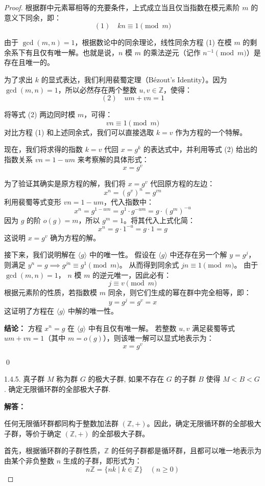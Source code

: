 \documentclass[]{article}
\begin{document}
\begin{proof}
根据群中元素幂相等的充要条件，上式成立当且仅当指数在模元素阶 $m$ 的意义下同余，即：
\[ (1) \quad kn \equiv 1 \pmod m \]

由于 $\gcd(m, n) = 1$，根据数论中的同余理论，线性同余方程 (1) 在模 $m$ 的剩余系下有且仅有唯一解。也就是说，$n$ 模 $m$ 的乘法逆元（记作 $n^{-1} \pmod m$）是存在且唯一的。

为了求出 $k$ 的显式表达，我们利用裴蜀定理（Bézout's Identity）。因为 $\gcd(m, n) = 1$，所以必然存在两个整数 $u, v \in \mathbb{Z}$，使得：
\[ (2) \quad um + vn = 1 \]

将等式 (2) 两边同时模 $m$，可得：
\[ vn \equiv 1 \pmod m \]
对比方程 (1) 和上述同余式，我们可以直接选取 $k = v$ 作为方程的一个特解。

现在，我们将求得的指数 $k = v$ 代回 $x = g^k$ 的表达式中，并利用等式 (2) 给出的指数关系 $vn = 1 - um$ 来考察解的具体形式：
\[ x = g^v \]

为了验证其确实是原方程的解，我们将 $x = g^v$ 代回原方程的左边：
\[ x^n = (g^v)^n = g^{vn} \]
利用裴蜀等式变形 $vn = 1 - um$，代入指数中：
\[ x^n = g^{1 - um} = g^1 \cdot g^{-um} = g \cdot (g^m)^{-u} \]
因为 $g$ 的阶 $o(g) = m$，所以 $g^m = 1$。将其代入上式化简：
\[ x^n = g \cdot 1^{-u} = g \cdot 1 = g \]
这说明 $x = g^v$ 确为方程的解。

接下来，我们说明解在 $\langle g\rangle$ 中的唯一性。
假设在 $\langle g\rangle$ 中还存在另一个解 $y = g^j$，则满足 $y^n = g \implies g^{jn} \equiv g^1 \pmod m$。
从而得到同余式 $jn \equiv 1 \pmod m$。
由于 $\gcd(m, n) = 1$， $n$ 模 $m$ 的逆元唯一，因此必有：
\[ j \equiv v \pmod m \]
根据元素阶的性质，若指数模 $m$ 同余，则它们生成的幂在群中完全相等，即：
\[ y = g^j = g^v = x \]
这证明了方程在 $\langle g\rangle$ 中解的唯一性。

\bigskip
\noindent \textbf{结论：} 
方程 $x^n = g$ 在 $\langle g\rangle$ 中有且仅有唯一解。
若整数 $u, v$ 满足裴蜀等式 $um + vn = 1$（其中 $m = o(g)$），则该唯一解可以显式地表示为：
\[ x = g^v \]

\qed

1.4.5. 真子群 $M$ 称为群 $G$ 的极大子群, 如果不存在 $G$ 的子群 $B$ 使得 $M < B < G$ . 确定无限循环群的全部极大子群. 

\bigskip
\noindent \textbf{解答：} 

任何无限循环群都同构于整数加法群 $(\mathbb{Z}, +)$。因此，确定无限循环群的全部极大子群，等价于确定 $(\mathbb{Z}, +)$ 的全部极大子群。

首先，根据循环群的子群性质，$\mathbb{Z}$ 的任何子群都是循环群，且都可以唯一地表示为由某个非负整数 $n$ 生成的子群，即形式为：
\[ n\mathbb{Z} = \{ nk \mid k \in \mathbb{Z} \} \quad (n \ge 0) \]


\end{proof}
\end{document}
